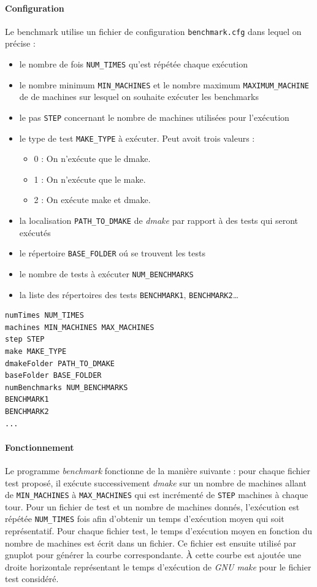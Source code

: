 \documentclass[a4paper,12pt,twoside]{article}
\begin{document}
\paragraph{Configuration}
Le benchmark utilise un fichier de configuration
\texttt{benchmark.cfg} dans lequel on précise : 
\begin{itemize}
\item le nombre de fois
\texttt{NUM\_TIMES} qu'est répétée chaque exécution
\item  le nombre minimum \texttt{MIN\_MACHINES}
et le nombre maximum \texttt{MAXIMUM\_MACHINE} de de machines 
sur lesquel on souhaite exécuter les benchmarks
\item le pas \texttt{STEP} concernant le nombre de machines utilisées
  pour l'exécution
\item le type de test \texttt{MAKE\_TYPE} à exécuter. Peut avoit trois valeurs :
	\begin{itemize}
	\item  0 : On n'exécute que le dmake.
	\item  1 : On n'exécute que le make.
	\item  2 : On exécute make et dmake.
	\end{itemize}
\item la localisation \texttt{PATH\_TO\_DMAKE} de \emph{dmake}
par rapport à des tests qui seront exécutés
\item le répertoire \texttt{BASE\_FOLDER} oú se trouvent les tests
\item le nombre de tests à exécuter \texttt{NUM\_BENCHMARKS}
\item la liste des répertoires des tests \texttt{BENCHMARK1}, \texttt{BENCHMARK2}\dots
\end{itemize}

\begin{verbatim}
numTimes NUM_TIMES
machines MIN_MACHINES MAX_MACHINES
step STEP
make MAKE_TYPE
dmakeFolder PATH_TO_DMAKE
baseFolder BASE_FOLDER
numBenchmarks NUM_BENCHMARKS
BENCHMARK1
BENCHMARK2
...
\end{verbatim}

\paragraph{Fonctionnement}

Le programme \emph{benchmark} fonctionne de la manière suivante : pour
chaque fichier test proposé, il exécute successivement \emph{dmake} sur un nombre de
machines allant de \texttt{MIN\_MACHINES} à \texttt{MAX\_MACHINES}
qui est incrémenté de \texttt{STEP} machines à chaque tour. Pour un
fichier de test et un nombre de machines donnés, l'exécution est
répétée \texttt{NUM\_TIMES} fois afin d'obtenir un temps d'exécution moyen
qui soit représentatif. 
Pour chaque fichier test, le temps d'exécution moyen en fonction du
nombre de machines est écrit dans un fichier. Ce fichier est ensuite
utilisé par gnuplot pour générer la courbe correspondante. À cette
courbe est ajoutée une droite horizontale représentant le temps
d'exécution de \emph{GNU make} pour le fichier test considéré. 
\end{document}
